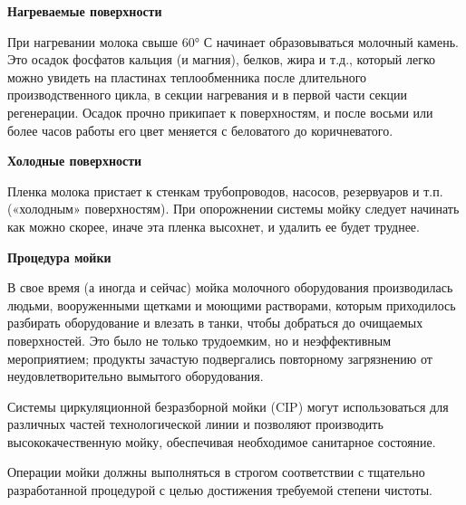 \documentclass[a4paper,12pt,oneside]{extarticle}
\begin{document}
	\begin{flushleft}
		\bfseries Нагреваемые поверхности
	\end{flushleft}
	
	\begin{flushleft}
		При нагревании молока свыше 60° С начинает образовываться молочный камень.
		Это осадок фосфатов кальция (и магния), белков, жира и т.д., который легко можно увидеть на пластинах теплообменника после длительного производственного цикла, в секции нагревания и в первой части секции регенерации. Осадок прочно прикипает к поверхностям, и после восьми или более часов работы его цвет меняется с беловатого до коричневатого.
	\end{flushleft}
	
	\begin{flushleft}
		\bfseries Холодные поверхности
	\end{flushleft}
	
	\begin{flushleft}
		Пленка молока пристает к стенкам трубопроводов, насосов, резервуаров и т.п. («холодным» поверхностям). При опорожнении системы мойку следует начинать как можно скорее, иначе эта пленка высохнет, и удалить ее будет труднее.
	\end{flushleft}
	
	\begin{flushleft}
		\bfseries 	Процедура мойки
	\end{flushleft}
	
	\begin{flushleft}
			В свое время (а иногда и сейчас) мойка молочного оборудования производилась людьми, вооруженными щетками и моющими растворами, которым приходилось разбирать оборудование и влезать в танки, чтобы добраться до очищаемых поверхностей. Это было не только трудоемким, но и неэффективным мероприятием; продукты зачастую подвергались повторному загрязнению от неудовлетворительно вымытого оборудования.
	\end{flushleft}
	
	\begin{flushleft}
	Системы циркуляционной безразборной мойки (CIP) могут использоваться для различных частей технологической линии и позволяют производить высококачественную мойку, обеспечивая необходимое санитарное состояние.
	\end{flushleft}
	
	\begin{flushleft}
Операции мойки должны выполняться в строгом соответствии с тщательно разработанной процедурой с целью достижения требуемой степени чистоты.
	\end{flushleft}
	
\end{document}
